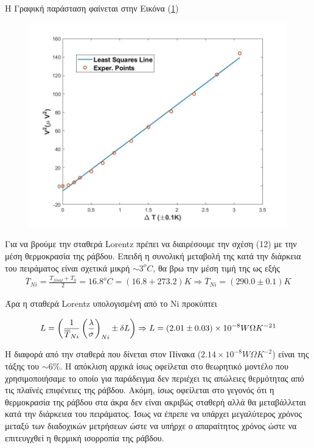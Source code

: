 \documentclass[a4paper]{article}
\begin{document}
		Η Γραφική παράσταση φαίνεται στην Εικόνα (\ref{Im2})
		\begin{figure}[h!]
			\centering
			\includegraphics[width=0.7\linewidth]{plot_ni.jpg}
			\caption{ }
			\label{Im2}
		\end{figure}
		
		Για να βρούμε την σταθερά Lorentz πρέπει να διαιρέσουμε την σχέση (12) με την μέση θερμοκρασία της ράβδου. Επειδή η συνολική μεταβολή της κατά την διάρκεια του πειράματος είναι σχετικά μικρή $\sim3^oC$, θα βρω την μέση τιμή της ως εξής
		\begin{align*}
			\overline{T}_{Ni} = \frac{T_{final}+T_0}{2} = 16.8^oC = (16.8+273.2)K \Rightarrow \overline{T}_{Ni} =( 290.0\pm 0.1)K
		\end{align*}
		
		Άρα η σταθερά Lorentz υπολογισμένη από το Ni προκύπτει
	
		\begin{align*}
			L = \left( \frac{1}{\overline{T}_{Ni}}\left(\frac{\lambda}{\sigma}\right)_{Ni} \pm \delta L\right) \Rightarrow 
			  L = ( 2.01\pm0.03 )\times10^{-8}W\Omega K^{-2} \footnotemark  
		\end{align*}
			
			Η διαφορά από την σταθερά που δίνεται στον Πίνακα ($2.14\times10^{-8}W\Omega K^{-2}$) είναι της τάξης του $\sim6\%$. Η απόκλιση αρχικά ίσως οφείλεται στο θεωρητικό μοντέλο που χρησιμοποιήσαμε το οποίο για παράδειγμα δεν περιέχει τις απώλειες θερμότητας από τις πλαϊνές επιφένειες της ράβδου. Ακόμη, ίσως οφείλεται στο γεγονός ότι η θερμοκρασία της ράβδου στα άκρα δεν είναι ακριβώς σταθερή αλλά θα μεταβάλλεται κατά την διάρκειεα του πειράματος. Ίσως να έπρεπε να υπάρχει μεγαλύτερος χρόνος μεταξύ των διαδοχικών μετρήσεων ώστε να υπήρχε ο απαραίτητος χρόνος ώστε να επιτευγχθεί η θερμική ισορροπία της ράβδου.
			
\end{document}

